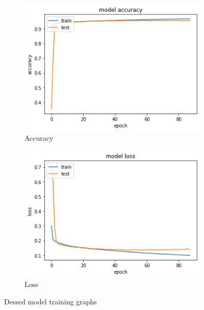 \documentclass{article}
\begin{document}
\begin{figure}[H]
	\centering
	\begin{subfigure}{.5\textwidth}
		\centering
		\includegraphics[width=.95\linewidth]{./images/poly/dessed_acc.png}
		\caption{Accuracy}
	\end{subfigure}%
	\begin{subfigure}{.5\textwidth}
		\centering
		\includegraphics[width=.95\linewidth]{./images/poly/dessed_loss.png}
		\caption{Loss}
	\end{subfigure}
	\caption{Dessed model training graphs}
	\label{fig:poly_des_result}
\end{figure}
\end{document}
